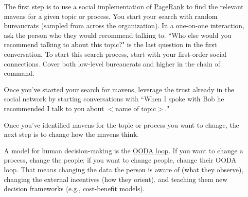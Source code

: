 The first step is to use a social implementation of \href{https://en.wikipedia.org/wiki/PageRank}{PageRank}
to find the relevant mavens for a given topic or process. You start your search with random bureaucrats (sampled from across the organization). In a one-on-one interaction, ask the person who they would recommend talking to.
``Who else would you recommend talking to about this topic?" is the last question in the first conversation.
To start this search process, start with your first-order social connections. Cover both low-level bureaucrats and higher in the chain of command.

Once you've started your search for mavens, leverage the trust already in the social network by starting conversations with ``When I spoke with Bob he recommended I talk to you about $<$name of topic$>$."


Once you've identified mavens for the topic or process you want to change, the next step is to change how the mavens think. 

A model for human decision-making is the 
\href{https://en.wikipedia.org/wiki/OODA_loop}{OODA loop}.
If you want to change a process, change the people; if you want to change people, change their OODA loop. That means changing the data the person is aware of (what they observe), changing the external incentives (how they orient), and teaching them new decision frameworks (e.g., cost-benefit models).



